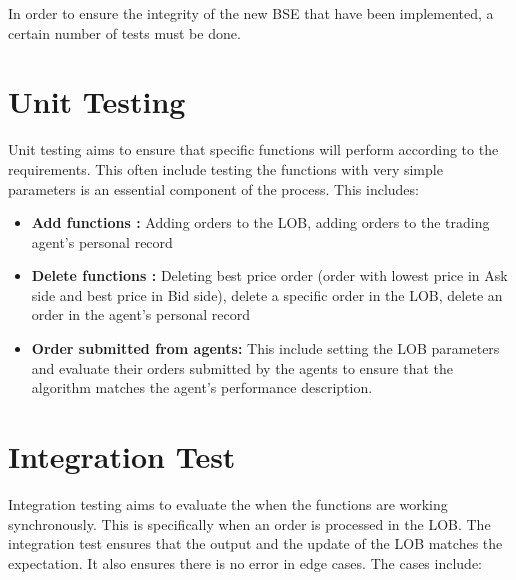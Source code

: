In order to ensure the integrity of the new BSE that have been implemented, a certain number of tests must be done. 

\section{Unit Testing} 
Unit testing aims to ensure that specific functions will perform according to the requirements. This often include testing the functions with very simple parameters is an essential component of the process. This includes:

\begin{itemize}
    \item \textbf{Add functions : } Adding orders to the LOB, adding orders to the trading agent's personal record 
    
    \item \textbf{Delete functions : } Deleting best price order (order with lowest price in Ask side and best price in Bid side), delete a specific order in the LOB, delete an order in the agent's personal record 
    
     \item \textbf{Order submitted from agents: } This include setting the LOB parameters and evaluate their orders submitted by the agents to ensure that the algorithm matches the agent's performance description. 
\end{itemize} 

\section{Integration Test}
Integration testing aims to evaluate the when the functions are working synchronously. This is specifically when an order is processed in the LOB. The integration test ensures that the output and the update of the LOB matches the expectation. It also ensures there is no error in edge cases. The cases include: 

